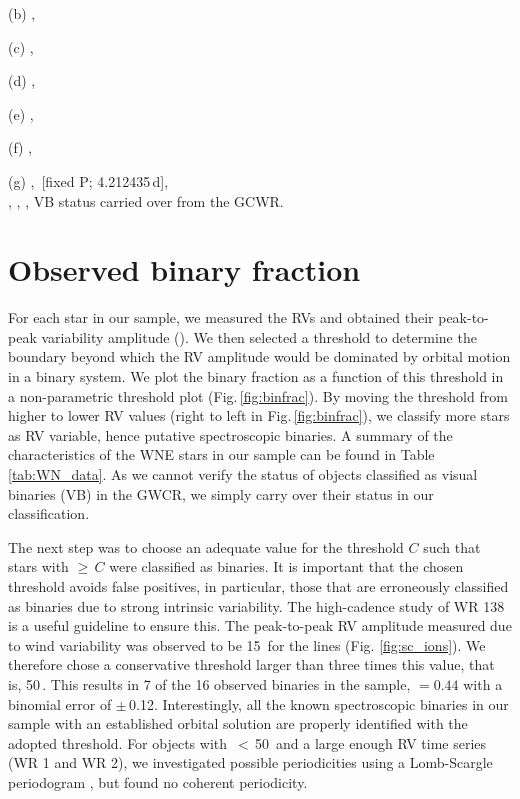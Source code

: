 \begin{table}
\begin{threeparttable}
\begin{tablenotes}
    \item[(b)] \citet{2020Koenigsberger},
    \item[(c)] \citet{2011delachevrotiere},\\
    \item[(d)] \citet{2021Richardson},
    \item[(e)] \citet{2016Richardson},
    \item[(f)] \citet{2013Palate},
    \item[(g)] \citet{1990Annuk},
     \citet{1994Marchenko}\,[fixed P; 4.212435\,d],\\
     \citet{1998Marchenko1998WR141},
     \citet{2009HuttonWR151},
     \citet{2021MaizAppelaniz},
     VB status carried over from the GCWR.
\end{tablenotes}
\end{threeparttable}
\label{tab:WN_data}
\end{table}


\section{Observed binary fraction}\label{sect:results_WNE}

For each star in our sample, we measured the RVs and obtained their peak-to-peak variability amplitude (\DelRV{}). We then selected a threshold to determine the boundary beyond which the RV amplitude would be dominated by orbital motion in a binary system. We plot the binary fraction as a function of this threshold in a non-parametric threshold plot (Fig.\,\ref{fig:binfrac}). By moving the threshold from higher to lower RV values (right to left in Fig.\,\ref{fig:binfrac}), we classify more stars as RV variable, hence putative spectroscopic binaries. A summary of the characteristics of the WNE stars in our sample can be found in Table \ref{tab:WN_data}. As we cannot verify the status of objects classified as visual binaries (VB) in the GWCR, we simply carry over their status in our classification.

The next step was to choose an adequate value for the threshold $C$ such that stars with \DelRV{}$\ge$\,$C$ were classified as binaries. It is important that the chosen threshold avoids false positives, in particular, those that are erroneously classified as binaries due to strong intrinsic variability. The high-cadence study of WR 138 is a useful guideline to ensure this. The peak-to-peak RV amplitude measured due to wind variability was observed to be 15\,\kms{} for the \nv{} lines (Fig. \ref{fig:sc_ions}). We therefore chose a conservative threshold larger than three times this value, that is, 50\,\kms{}. This results in 7 of the 16 observed binaries in the sample, \fobsWNE{} $= 0.44$ with a binomial error of $\pm$\,0.12. Interestingly, all the known spectroscopic binaries in our sample with an established orbital solution are properly identified with the adopted threshold. For objects with \DelRV{}\,$<$\,50\,\kms{} and a large enough RV time series (WR 1 and WR 2), we investigated possible periodicities using a Lomb-Scargle periodogram \citep{1976Lomb,1982Scargle}, but found no coherent periodicity.


